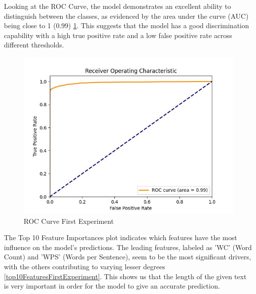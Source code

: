 Looking at the ROC Curve, the model demonstrates an excellent ability to distinguish between the classes, as evidenced by the area under the curve (AUC) being close to 1 (0.99) \ref{rocCurveFirstExperiment}. This suggests that the model has a good discrimination capability with a high true positive rate and a low false positive rate across different thresholds.

\begin{figure}[htbp]
	\centering
		\includegraphics[scale=0.8]{LaTeX Bachelor Thesis Depression Signs Detection/figures/metrics/experiment1English/roc_curve.jpg}
	\caption{ROC Curve First Experiment}
	\label{rocCurveFirstExperiment}
\end{figure}

The Top 10 Feature Importances plot indicates which features have the most influence on the model's predictions. The leading features, labeled as 'WC' (Word Count) and 'WPS' (Words per Sentence), seem to be the most significant drivers, with the others contributing to varying lesser degrees \ref{top10FeaturesFirstExperiment}. This shows us that the length of the given text is very important in order for the model to give an accurate prediction.

